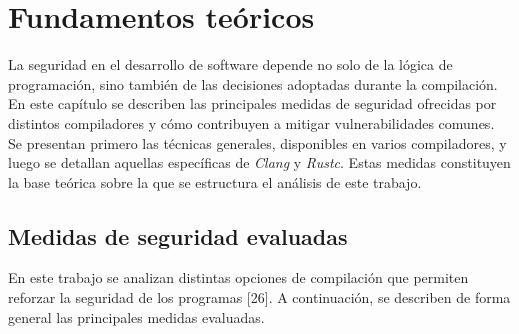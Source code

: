 \chapter{Fundamentos teóricos}
\label{chap:fundamentos}

La seguridad en el desarrollo de software depende no solo de la lógica de programación, sino también de las decisiones adoptadas durante la compilación. En este capítulo se describen las principales medidas de seguridad ofrecidas por distintos compiladores y cómo contribuyen a mitigar vulnerabilidades comunes. Se presentan primero las técnicas generales, disponibles en varios compiladores, y luego se detallan aquellas específicas de \emph{Clang} y \emph{Rustc}. Estas medidas constituyen la base teórica sobre la que se estructura el análisis de este trabajo.

\section{Medidas de seguridad evaluadas}

En este trabajo se analizan distintas opciones de compilación que
permiten reforzar la seguridad de los programas [26]. A continuación, se
describen de forma general las principales medidas evaluadas.


